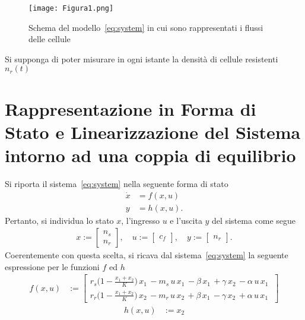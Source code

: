 \documentclass[a4paper, 11pt]{article}
\begin{document}
\begin{figure}[h!]
    \centering
    \texttt{[image: Figura1.png]}
    \caption{Schema del modello~\eqref{eq:system} in cui sono rappresentati i flussi delle cellule}
    \label{fig:enter-label}
\end{figure}

Si supponga di poter misurare in ogni istante la densità di cellule resistenti $n_r(t)$



\section{Rappresentazione in Forma di Stato e Linearizzazione del Sistema intorno ad una coppia di equilibrio}

Si riporta il sistema~\eqref{eq:system} nella seguente forma di stato
%
\begin{subequations}
\begin{align}\label{eq:state_form}
	\dot{x} &= f(x,u)
	\\
	y &= h(x,u).
\end{align}
\end{subequations}
%
Pertanto, si individua lo stato $x$, l'ingresso $u$ e l'uscita $y$ del sistema come segue 
%
\begin{align*}
	x := \begin{bmatrix}
		n_s
		\\
		n_r
	\end{bmatrix}, \quad u := \begin{bmatrix}c_f\end{bmatrix}, \quad y := \begin{bmatrix}n_r\end{bmatrix}.
\end{align*}
%
Coerentemente con questa scelta, si ricava dal sistema~\eqref{eq:system} la seguente espressione per le funzioni $f$ ed $h$
%
\begin{align*}
	f(x,u) &:=\begin{bmatrix}
		 r_s \bigl(1-\frac{x_1+x_2}{K}\bigr)\, x_1\, -m_s\, u\, x_1\, -\beta\, x_1\, +\gamma\, x_2\, -\alpha\, u\, x_1\ 
	\\
	r_r \bigl(1-\frac{x_1+x_2 }{K}\bigr)\, x_2\, -m_r\, u\, x_2\, +\beta\, x_1\, -\gamma\, x_2\, +\alpha\, u\, x_1\ 
	\end{bmatrix}
\end{align*}
\begin{align*}
	h(x,u) &:= x_2
\end{align*}
\end{document}

